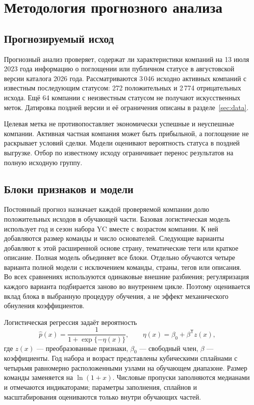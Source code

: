 \clearpage
\section{Методология прогнозного анализа}
\label{sec:modeling-methods}

\subsection{Прогнозируемый исход}

Прогнозный анализ проверяет, содержат ли характеристики компаний на 13 июля 2023 года информацию о поглощении или публичном статусе в августовской версии каталога 2026 года. Рассматриваются 3\,046 исходно активных компаний с известным последующим статусом: 272 положительных и 2\,774 отрицательных исхода. Ещё 64 компании с неизвестным статусом не получают искусственных меток. Датировка поздней версии и её ограничения описаны в разделе~\ref{sec:data}.

Целевая метка не противопоставляет экономически успешные и неуспешные компании. Активная частная компания может быть прибыльной, а поглощение не раскрывает условий сделки. Модели оценивают вероятность статуса в поздней выгрузке. Отбор по известному исходу ограничивает перенос результатов на полную исходную группу.

\subsection{Блоки признаков и модели}

Постоянный прогноз назначает каждой проверяемой компании долю положительных исходов в обучающей части. Базовая логистическая модель использует год и сезон набора YC вместе с возрастом компании. К ней добавляются размер команды и число основателей. Следующие варианты добавляют к этой расширенной основе страну, тематические теги или краткое описание. Полная модель объединяет все блоки. Отдельно обучаются четыре варианта полной модели с исключением команды, страны, тегов или описания. Во всех сравнениях используются одинаковые внешние разбиения; регуляризация каждого варианта подбирается заново во внутреннем цикле. Поэтому оценивается вклад блока в выбранную процедуру обучения, а не эффект механического обнуления коэффициентов.

Логистическая регрессия задаёт вероятность
\[
\widehat p(x)=\frac{1}{1+\exp\{-\eta(x)\}},\qquad
\eta(x)=\beta_0+\beta^{\mathsf T}z(x),
\]
где $z(x)$ --- преобразованные признаки, $\beta_0$ --- свободный член, $\beta$ --- коэффициенты. Год набора и возраст представлены кубическими сплайнами с четырьмя равномерно расположенными узлами на обучающем диапазоне. Размер команды заменяется на $\ln(1+x)$. Числовые пропуски заполняются медианами и отмечаются индикаторами; параметры заполнения, сплайнов и масштабирования оцениваются только внутри обучающих частей.

